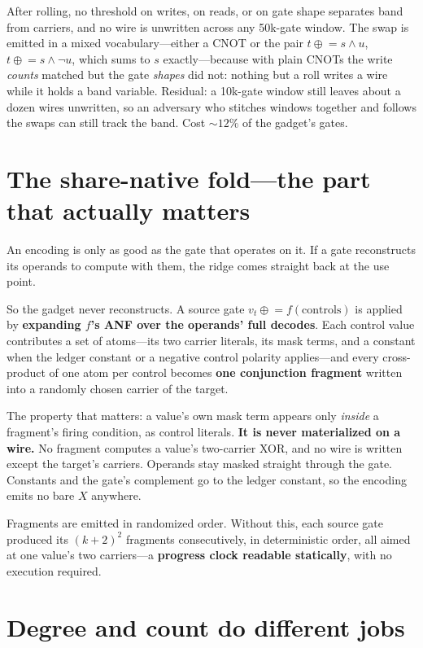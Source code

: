 \documentclass[11pt]{article}
\newcommand{\xor}{\oplus}
\begin{document}
After rolling, no threshold on writes, on reads, or on gate shape separates band
from carriers, and no wire is unwritten across any 50k-gate window. The swap is
emitted in a mixed vocabulary---either a CNOT or the pair
$t \mathrel{\xor}= s \wedge u$, $t \mathrel{\xor}= s \wedge \neg u$, which sums
to $s$ exactly---because with plain CNOTs the write \emph{counts} matched but the
gate \emph{shapes} did not: nothing but a roll writes a wire while it holds a
band variable. Residual: a 10k-gate window still leaves about a dozen wires
unwritten, so an adversary who stitches windows together and follows the swaps
can still track the band. Cost ${\sim}12\%$ of the gadget's gates.

\section{The share-native fold---the part that actually matters}

An encoding is only as good as the gate that operates on it. If a gate
reconstructs its operands to compute with them, the ridge comes straight back at
the use point.

So the gadget never reconstructs. A source gate $v_t \mathrel{\xor}= f(\text{controls})$
is applied by \textbf{expanding $f$'s ANF over the operands' full decodes}. Each
control value contributes a set of atoms---its two carrier literals, its mask
terms, and a constant when the ledger constant or a negative control polarity
applies---and every cross-product of one atom per control becomes \textbf{one
conjunction fragment} written into a randomly chosen carrier of the target.

The property that matters: a value's own mask term appears only \emph{inside} a
fragment's firing condition, as control literals. \textbf{It is never
materialized on a wire.} No fragment computes a value's two-carrier XOR, and no
wire is written except the target's carriers. Operands stay masked straight
through the gate. Constants and the gate's complement go to the ledger constant,
so the encoding emits no bare $X$ anywhere.

Fragments are emitted in randomized order. Without this, each source gate
produced its $(k+2)^2$ fragments consecutively, in deterministic order, all
aimed at one value's two carriers---a \textbf{progress clock readable
statically}, with no execution required.

\section{Degree and count do different jobs}
\end{document}
